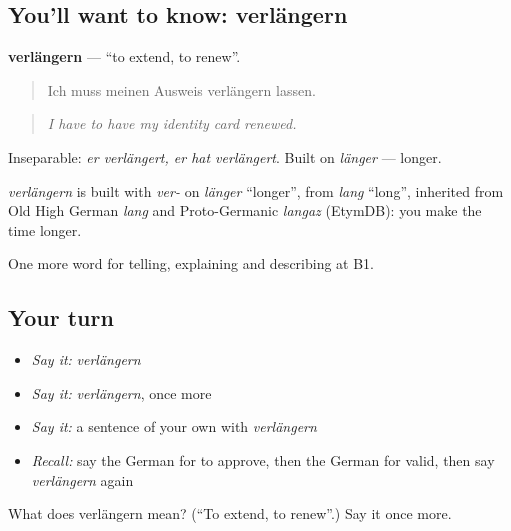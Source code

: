 \subsection*{You'll want to know: verlängern}
\textbf{verlängern} — \textquotedblleft{}to extend, to renew\textquotedblright{}.

\begin{quote}
Ich muss meinen Ausweis verlängern lassen.
\end{quote}

\begin{quote}
\emph{I have to have my identity card renewed.}
\end{quote}

Inseparable: \emph{er verlängert, er hat verlängert}. Built on \emph{länger} — longer.

\begin{cousinweb}
\emph{verlängern} is built with \emph{ver-} on \emph{länger} \textquotedblleft{}longer\textquotedblright{}, from \emph{lang} \textquotedblleft{}long\textquotedblright{}, inherited from Old High German \emph{lang} and Proto-Germanic \emph{langaz} (EtymDB): you make the time longer.
\end{cousinweb}

\begin{grammarlens}[title={What you've built}]
One more word for telling, explaining and describing at B1.
\end{grammarlens}

\subsection*{Your turn}
\begin{itemize}
\raggedright
  \item \emph{Say it:} \emph{verlängern}
  \item \emph{Say it:} \emph{verlängern}, once more
  \item \emph{Say it:} a sentence of your own with \emph{verlängern}
  \item \emph{Recall:} say the German for to approve, then the German for valid, then say \emph{verlängern} again
\end{itemize}

\begin{tcolorbox}[breakable,colback=teal!4,colframe=teal!35!black,title={Before you move on}]
What does verlängern mean? (\textquotedblleft{}To extend, to renew\textquotedblright{}.) Say it once more.
\end{tcolorbox}
